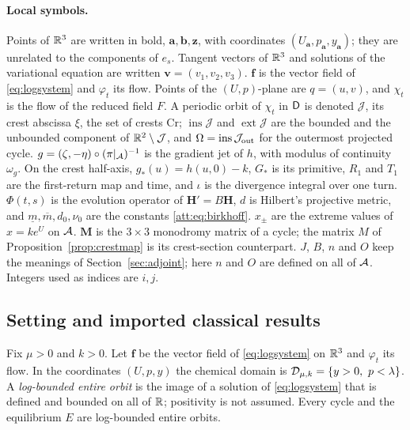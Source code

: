 \paragraph{Local symbols.} Points of $\mathbb R^3$ are written in bold, $\mathbf a,\mathbf b,\mathbf z$, with coordinates $(U_{\mathbf a},p_{\mathbf a},y_{\mathbf a})$; they are unrelated to the components of $e_s$. Tangent vectors of $\mathbb R^3$ and solutions of the variational equation are written $\mathbf v=(v_1,v_2,v_3)$. $\mathbf f$ is the vector field of \eqref{eq:logsystem} and $\varphi_t$ its flow. Points of the $(U,p)$-plane are $q=(u,v)$, and $\chi_t$ is the flow of the reduced field $F$. A periodic orbit of $\chi_t$ in $\mathsf D$ is denoted $\mathcal J$, its crest abscissa $\xi$, the set of crests $\mathrm{Cr}$; $\operatorname{ins}\mathcal J$ and $\operatorname{ext}\mathcal J$ are the bounded and the unbounded component of $\mathbb R^2\setminus\mathcal J$, and $\Omega=\operatorname{ins}\mathcal J_{\rm out}$ for the outermost projected cycle. $g=(\zeta,-\eta)\circ(\pi|_{\mathcal A})^{-1}$ is the gradient jet of $h$, with modulus of continuity $\omega_g$. On the crest half-axis, $g_\ast(u)=h(u,0)-k$, $G_\ast$ is its primitive, $R_1$ and $T_1$ are the first-return map and time, and $\iota$ is the divergence integral over one turn. $\Phi(t,s)$ is the evolution operator of $\mathbf H'=B\mathbf H$, $d$ is Hilbert's projective metric, and $\underline m,\overline m,d_0,\nu_0$ are the constants \eqref{att:eq:birkhoff}. $x_\pm$ are the extreme values of $x=ke^{U}$ on $\mathcal A$. $\mathbf M$ is the $3\times3$ monodromy matrix of a cycle; the matrix $M$ of Proposition~\ref{prop:crestmap} is its crest-section counterpart. $J$, $B$, $n$ and $O$ keep the meanings of Section~\ref{sec:adjoint}; here $n$ and $O$ are defined on all of $\mathcal A$. Integers used as indices are $i,j$.

\subsection{Setting and imported classical results}\label{att:sec:setting}
Fix $\mu>0$ and $k>0$. Let $\mathbf f$ be the vector field of \eqref{eq:logsystem} on $\mathbb R^3$ and $\varphi_t$ its flow. In the coordinates $(U,p,y)$ the chemical domain is $\Dom=\{y>0,\ p<\lambda\}$. A \emph{log-bounded entire orbit} is the image of a solution of \eqref{eq:logsystem} that is defined and bounded on all of $\mathbb R$; positivity is not assumed. Every cycle and the equilibrium $E$ are log-bounded entire orbits.

